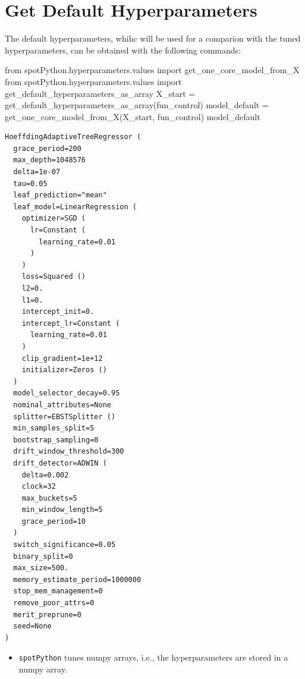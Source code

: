 \documentclass[
  letterpaper,
  DIV=11,
  numbers=noendperiod]{scrreprt}
\newenvironment{Shaded}{\begin{snugshade}}{\end{snugshade}}
\newcommand{\ImportTok}[1]{\textcolor[rgb]{0.00,0.46,0.62}{#1}}
\newcommand{\NormalTok}[1]{\textcolor[rgb]{0.00,0.23,0.31}{#1}}
\newcommand{\OperatorTok}[1]{\textcolor[rgb]{0.37,0.37,0.37}{#1}}
\providecommand{\tightlist}{%
  \setlength{\itemsep}{0pt}\setlength{\parskip}{0pt}}\usepackage{longtable,booktabs,array}
\begin{document}
\section{Get Default Hyperparameters}\label{get-default-hyperparameters}

The default hyperparameters, whihc will be used for a comparion with the
tuned hyperparameters, can be obtained with the following commands:

\begin{Shaded}
\begin{Highlighting}[]
\ImportTok{from}\NormalTok{ spotPython.hyperparameters.values }\ImportTok{import}\NormalTok{ get\_one\_core\_model\_from\_X}
\ImportTok{from}\NormalTok{ spotPython.hyperparameters.values }\ImportTok{import}\NormalTok{ get\_default\_hyperparameters\_as\_array}
\NormalTok{X\_start }\OperatorTok{=}\NormalTok{ get\_default\_hyperparameters\_as\_array(fun\_control)}
\NormalTok{model\_default }\OperatorTok{=}\NormalTok{ get\_one\_core\_model\_from\_X(X\_start, fun\_control)}
\NormalTok{model\_default}
\end{Highlighting}
\end{Shaded}

\begin{verbatim}
HoeffdingAdaptiveTreeRegressor (
  grace_period=200
  max_depth=1048576
  delta=1e-07
  tau=0.05
  leaf_prediction="mean"
  leaf_model=LinearRegression (
    optimizer=SGD (
      lr=Constant (
        learning_rate=0.01
      )
    )
    loss=Squared ()
    l2=0.
    l1=0.
    intercept_init=0.
    intercept_lr=Constant (
      learning_rate=0.01
    )
    clip_gradient=1e+12
    initializer=Zeros ()
  )
  model_selector_decay=0.95
  nominal_attributes=None
  splitter=EBSTSplitter ()
  min_samples_split=5
  bootstrap_sampling=0
  drift_window_threshold=300
  drift_detector=ADWIN (
    delta=0.002
    clock=32
    max_buckets=5
    min_window_length=5
    grace_period=10
  )
  switch_significance=0.05
  binary_split=0
  max_size=500.
  memory_estimate_period=1000000
  stop_mem_management=0
  remove_poor_attrs=0
  merit_preprune=0
  seed=None
)
\end{verbatim}

\begin{tcolorbox}[enhanced jigsaw, coltitle=black, bottomrule=.15mm, breakable, toprule=.15mm, colframe=quarto-callout-note-color-frame, title=\textcolor{quarto-callout-note-color}{\faInfo}\hspace{0.5em}{Note: \texttt{spotPython} tunes numpy arrays}, colbacktitle=quarto-callout-note-color!10!white, opacityback=0, left=2mm, leftrule=.75mm, colback=white, rightrule=.15mm, bottomtitle=1mm, toptitle=1mm, titlerule=0mm, arc=.35mm, opacitybacktitle=0.6]

\begin{itemize}
\tightlist
\item
  \texttt{spotPython} tunes numpy arrays, i.e., the hyperparameters are
  stored in a numpy array.
\end{itemize}

\end{tcolorbox}
\end{document}
